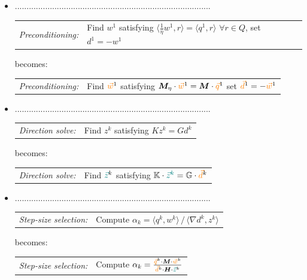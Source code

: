 \begin{itemize}
\item ....................................................................................
\begin{algobox}{}
\begin{tabular}{@{}r@{\quad}l@{}}
\textit{Preconditioning:} & Find $w^1$ satisfying $\langle \tfrac{1}{\eta} w^1, r \rangle = \langle q^1, r \rangle$ \; $\forall r \in Q$, \; set $d^1 = -w^1$ 
\end{tabular} 
\end{algobox}
becomes:
\begin{algobox}{}
\begin{tabular}{@{}r@{\quad}l@{}}
\textit{Preconditioning:} & Find ${\color{orange} \vec{w}}^1$ satisfying ${\bm M}_\eta \cdot {\color{orange}\vec{w}}^1 = {\bm M}\cdot {\color{orange}\vec{q}}^1$
\; set ${\color{orange}\vec{d}}^1 = -{\color{orange}\vec{w}}^1$ 
\end{tabular} 
\end{algobox}

\item ....................................................................................
\begin{algobox}{}
\begin{tabular}{@{}r@{\quad}l@{}}
\textit{Direction solve:} & Find $z^k$ satisfying $K z^k = G d^k$ 
\end{tabular} 
\end{algobox}
becomes:
\begin{algobox}{}
\begin{tabular}{@{}r@{\quad}l@{}}
\textit{Direction solve:} & Find ${\color{teal}\vec{z}}^k$ satisfying ${\mathbb{K}} \cdot {\color{teal}\vec{z}^k} 
= {\mathbb{G}} \cdot {\color{orange}\vec{d}}^k$ 
\end{tabular} 
\end{algobox}

\item ....................................................................................
\begin{algobox}{}
\begin{tabular}{@{}r@{\quad}l@{}}
\textit{Step-size selection:} & Compute $\alpha_k = \langle q^k, w^k \rangle \,/\, \langle \nabla d^k, z^k \rangle$ 
\end{tabular} 
\end{algobox}
becomes:
\begin{algobox}{}
\begin{tabular}{@{}r@{\quad}l@{}}
\textit{Step-size selection:} & Compute $\alpha_k = \frac{ {\color{orange}\vec{q}}^k \cdot {\bm M} \cdot {\color{orange}\vec{w}}^k }{ {\color{orange} \vec{d}}^k\cdot {\bm H} \cdot {\color{teal} \vec{z}}^k  }$ 
\end{tabular} 
\end{algobox}



\end{itemize}
